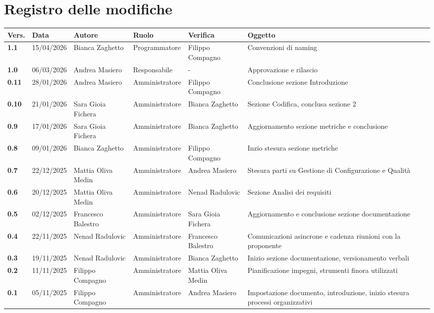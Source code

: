 \documentclass[a4paper,12pt]{article}
\begin{document}


\section*{Registro delle modifiche}
    \begin{xltabular}{\textwidth}{|l|l|X|l|X|X|}
        \hline
        \textbf{Vers.} & \textbf{Data} & \textbf{Autore} & \textbf{Ruolo} & \textbf{Verifica} & \textbf{Oggetto} \\
        \hline
        \endhead

        \endfoot

        \hline
        \endlastfoot

        \textbf{1.1} & 15/04/2026 & Bianca Zaghetto & Programmatore & Filippo Compagno & Convenzioni di naming \\
        \hline
        \textbf{1.0} & 06/03/2026 & Andrea Masiero & Responsabile & - & Approvazione e rilascio \\
        \hline
        \textbf{0.11} & 28/01/2026 & Andrea Masiero & Amministratore & Filippo Compagno & Conclusione sezione Introduzione \\
        \hline
        \textbf{0.10} & 21/01/2026 & Sara Gioia Fichera & Amministratore & Bianca Zaghetto & Sezione Codifica, conclusa sezione 2 \\
        \hline
        \textbf{0.9} & 17/01/2026 & Sara Gioia Fichera & Amministratore & Bianca Zaghetto & Aggiornamento sezione metriche e conclusione \\
        \hline
        \textbf{0.8} & 09/01/2026 & Bianca Zaghetto & Amministratore & Filippo Compagno & Inzio stesura sezione metriche \\
        \hline
        \textbf{0.7} & 22/12/2025 & Mattia Oliva Medin & Amministratore & Andrea Masiero & Stesura parti su Gestione di Configurazione e Qualità \\
        \hline
        \textbf{0.6} & 20/12/2025 & Mattia Oliva Medin & Amministratore & Nenad Radulovic & Sezione Analisi dei requisiti \\
        \hline
        \textbf{0.5} & 02/12/2025 & Francesco Balestro & Amministratore & Sara Gioia Fichera & Aggiornamento e conclusione sezione documentazione \\
        \hline
        \textbf{0.4} & 22/11/2025 & Nenad Radulovic & Amministratore & Francesco Balestro & Comunicazioni asincrone e cadenza riunioni con la proponente \\
        \hline
        \textbf{0.3} & 19/11/2025 & Nenad Radulovic & Amministratore & Bianca Zaghetto & Inizio sezione documentazione, versionamento verbali \\
        \hline
        \textbf{0.2} & 11/11/2025 & Filippo Compagno & Amministratore & Mattia Oliva Medin & Pianificazione impegni, strumenti finora utilizzati \\
        \hline
        \textbf{0.1} & 05/11/2025 & Filippo Compagno & Amministratore & Andrea Masiero & Impostazione documento, introduzione, inizio stesura processi organizzativi \\
    \end{xltabular}
\end{document}
